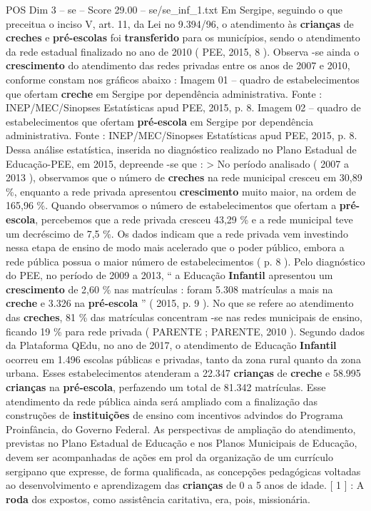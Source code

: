 \begin{textsample}{POS Dim 3 – se – Score 29.00 – se/se\_inf\_1.txt}
Em Sergipe, seguindo o que preceitua o inciso V, art. 11, da Lei no 9.394/96, o atendimento às \textbf{crianças} de \textbf{creches} e \textbf{pré-escolas} foi \textbf{transferido} para os municípios, sendo o atendimento da rede estadual finalizado no ano de 2010 ( PEE, 2015, 8 ).
Observa -se ainda o \textbf{crescimento} do atendimento das redes privadas entre os anos de 2007 e 2010, conforme constam nos gráficos abaixo : Imagem 01 – quadro de estabelecimentos que ofertam \textbf{creche} em Sergipe por dependência administrativa.
Fonte : INEP/MEC/Sinopses Estatísticas apud PEE, 2015, p. 8.
Imagem 02 – quadro de estabelecimentos que ofertam \textbf{pré-escola} em Sergipe por dependência administrativa.
Fonte : INEP/MEC/Sinopses Estatísticas apud PEE, 2015, p. 8.
Dessa análise estatística, inserida no diagnóstico realizado no Plano Estadual de Educação-PEE, em 2015, depreende -se que : > No período analisado ( 2007 a 2013 ), observamos que o número de \textbf{creches} na rede municipal cresceu em 30,89 \%, enquanto a rede privada apresentou \textbf{crescimento} muito maior, na ordem de 165,96 \%.
Quando observamos o número de estabelecimentos que ofertam a \textbf{pré-escola}, percebemos que a rede privada cresceu 43,29 \% e a rede municipal teve um decréscimo de 7,5 \%.
Os dados indicam que a rede privada vem investindo nessa etapa de ensino de modo mais acelerado que o poder público, embora a rede pública possua o maior número de estabelecimentos ( p. 8 ).
Pelo diagnóstico do PEE, no período de 2009 a 2013, “ a Educação \textbf{Infantil} apresentou um \textbf{crescimento} de 2,60 \% nas matrículas : foram 5.308 matrículas a mais na \textbf{creche} e 3.326 na \textbf{pré-escola} ” ( 2015, p. 9 ).
No que se refere ao atendimento das \textbf{creches}, 81 \% das matrículas concentram -se nas redes municipais de ensino, ficando 19 \% para rede privada ( PARENTE ; PARENTE, 2010 ).
Segundo dados da Plataforma QEdu, no ano de 2017, o atendimento de Educação \textbf{Infantil} ocorreu em 1.496 escolas públicas e privadas, tanto da zona rural quanto da zona urbana.
Esses estabelecimentos atenderam a 22.347 \textbf{crianças} de \textbf{creche} e 58.995 \textbf{crianças} na \textbf{pré-escola}, perfazendo um total de 81.342 matrículas.
Esse atendimento da rede pública ainda será ampliado com a finalização das construções de \textbf{instituições} de ensino com incentivos advindos do Programa Proinfância, do Governo Federal.
As perspectivas de ampliação do atendimento, previstas no Plano Estadual de Educação e nos Planos Municipais de Educação, devem ser acompanhadas de ações em prol da organização de um currículo sergipano que expresse, de forma qualificada, as concepções pedagógicas voltadas ao desenvolvimento e aprendizagem das \textbf{crianças} de 0 a 5 anos de idade. [ 1 ] : A \textbf{roda} dos expostos, como assistência caritativa, era, pois, missionária.

\end{textsample}
